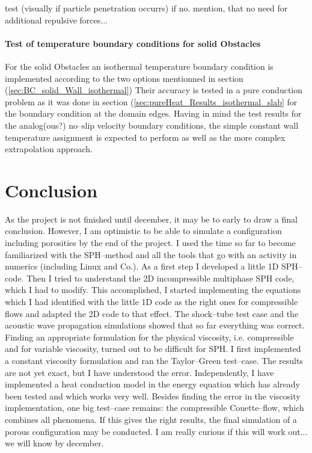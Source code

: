 \documentclass{report}
\begin{document}
test (visually if particle penetration occurrs) if no. mention, that no need for additional repulsive forces...

\subsubsection{Test of temperature boundary conditions for solid Obstacles}

For the solid Obstacles an isothermal temperature boundary condition is implemented according to the two options mentionned in section (\ref{sec:BC_solid_Wall_isothermal})
Their accuracy is tested in a pure conduction problem as it was done in section (\ref{sec:pureHeat_Results_isothermal_slab} for the boundary condition at the domain edges. Having in mind the test results for the analog(ous?) no--slip velocity boundary conditions, the simple constant wall temperature assignment is expected to perform as well as the more complex extrapolation approach. 

 \chapter{Conclusion}
\label{sec:conclusion}
As the project is not finished until december, it may be to early to draw a final conclusion. However, I am optimistic to be able to simulate a configuration including porosities by the end of the project. I used the time so far to become familiarized with the SPH--method and all the tools that go with an activity in numerics (including Linux and Co.). As a first step I developed a little 1D SPH--code. Then I tried to understand the 2D incompressible multiphase SPH code, which I had to modify. This accomplished, I started implementing the equations which I had identified with the little 1D code as the right ones for compressible flows and adapted the 2D code to that effect. The shock--tube test case and the acoustic wave propagation simulations showed that so far everything was correct.
Finding an appropriate formulation for the physical viscosity, i.e. compressible and for variable viscosity, turned out to be difficult for SPH. I first implemented a constant viscosity formulation and ran the Taylor--Green test--case. The results are not yet exact, but I have understood the error. Independently, I have implemented a heat conduction model in the energy equation which has already been tested and which works very well.
Besides finding the error in the viscosity implementation, one big test--case remains: the compressible Couette--flow, which combines all phenomena.
If this gives the right results, the final simulation of a porous configuration may be conducted. I am really curious if this will work out... we will know by december.
\end{document}
